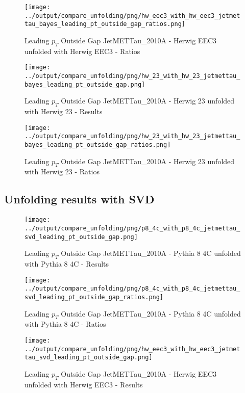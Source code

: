 \documentclass[11pt]{book}
\begin{document}
\begin{figure}[ht]
\centering
\texttt{[image: ../output/compare\_unfolding/png/hw\_eec3\_with\_hw\_eec3\_jetmettau\_bayes\_leading\_pt\_outside\_gap\_ratios.png]}
\caption{Leading $p_{T}$ Outside Gap JetMETTau\_2010A - Herwig EEC3 unfolded with Herwig EEC3 - Ratios}
\label{hw_eec3_hw_eec3_jetmettau_bayes_leading_pt_outside_gap_b}
\end{figure}

\begin{figure}[ht]
\centering
\texttt{[image: ../output/compare\_unfolding/png/hw\_23\_with\_hw\_23\_jetmettau\_bayes\_leading\_pt\_outside\_gap.png]}
\caption{Leading $p_{T}$ Outside Gap JetMETTau\_2010A - Herwig 23 unfolded with Herwig 23 - Results}
\label{hw_23_hw_23_jetmettau_bayes_leading_pt_outside_gap_a}
\end{figure}

\begin{figure}[ht]
\centering
\texttt{[image: ../output/compare\_unfolding/png/hw\_23\_with\_hw\_23\_jetmettau\_bayes\_leading\_pt\_outside\_gap\_ratios.png]}
\caption{Leading $p_{T}$ Outside Gap JetMETTau\_2010A - Herwig 23 unfolded with Herwig 23 - Ratios}
\label{hw_23_hw_23_jetmettau_bayes_leading_pt_outside_gap_b}
\end{figure}

\clearpage
\subsection{Unfolding results with SVD}

\begin{figure}[ht]
\centering
\texttt{[image: ../output/compare\_unfolding/png/p8\_4c\_with\_p8\_4c\_jetmettau\_svd\_leading\_pt\_outside\_gap.png]}
\caption{Leading $p_{T}$ Outside Gap JetMETTau\_2010A - Pythia 8 4C unfolded with Pythia 8 4C - Results}
\label{p8_p8_jetmettau_svd_leading_pt_outside_gap_a}
\end{figure}

\begin{figure}[ht]
\centering
\texttt{[image: ../output/compare\_unfolding/png/p8\_4c\_with\_p8\_4c\_jetmettau\_svd\_leading\_pt\_outside\_gap\_ratios.png]}
\caption{Leading $p_{T}$ Outside Gap JetMETTau\_2010A - Pythia 8 4C unfolded with Pythia 8 4C - Ratios}
\label{p8_p8_jetmettau_svd_leading_pt_outside_gap_b}
\end{figure}

\begin{figure}[ht]
\centering
\texttt{[image: ../output/compare\_unfolding/png/hw\_eec3\_with\_hw\_eec3\_jetmettau\_svd\_leading\_pt\_outside\_gap.png]}
\caption{Leading $p_{T}$ Outside Gap JetMETTau\_2010A - Herwig EEC3 unfolded with Herwig EEC3 - Results}
\label{hw_eec3_hw_eec3_jetmettau_svd_leading_pt_outside_gap_a}
\end{figure}
\end{document}
